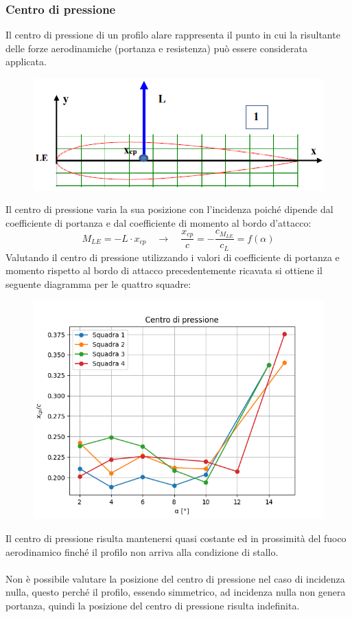 \subsubsection{Centro di pressione}
Il centro di pressione di un profilo alare rappresenta il punto in cui la risultante delle forze aerodinamiche (portanza e resistenza) può essere considerata applicata.
\begin{figure}[H]
    \centering
    \includegraphics[width=.7\textwidth]{images/5/xcpimage.png}
\end{figure}

\noindent Il centro di pressione varia la sua posizione con l'incidenza poiché dipende dal coefficiente di portanza e dal coefficiente di momento al bordo d'attacco:
\begin{equation*}
    M_{LE} = -L\cdot x_{cp} \quad \rightarrow \quad \frac{x_{cp}}c = - \frac{c_{M_{LE}}}{c_L} = f(\alpha)
\end{equation*}
Valutando il centro di pressione utilizzando i valori di coefficiente di portanza e momento rispetto al bordo di attacco precedentemente ricavata si ottiene il seguente diagramma per le quattro squadre:
\begin{figure}[H]
    \centering
    \includegraphics[width=.7\textwidth]{images/5/xcp.png}
\end{figure}

\noindent Il centro di pressione risulta mantenersi quasi costante ed in prossimità del fuoco aerodinamico finché il profilo non arriva alla condizione di stallo.\\\\
Non è possibile valutare la posizione del centro di pressione nel caso di incidenza nulla, questo perché il profilo, essendo simmetrico, ad incidenza nulla non genera portanza, quindi la posizione del centro di pressione risulta indefinita.

